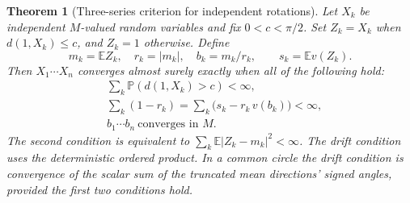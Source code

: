 \documentclass[11pt,reqno]{amsart}
\newtheorem{theorem}{Theorem}[section]
\theoremstyle{definition}
\theoremstyle{remark}
\numberwithin{equation}{section}
\begin{document}
\begin{theorem}[Three-series criterion for independent rotations]\label{m6:three}
Let \(X_k\) be independent \(M\)-valued random variables and fix
\(0<c<\pi/2\). Set \(Z_k=X_k\) when \(d(1,X_k)\le c\), and
\(Z_k=1\) otherwise. Define
\[
 m_k=\mathbb E Z_k,\quad r_k=|m_k|,\quad b_k=m_k/r_k,\qquad
 s_k=\mathbb E v(Z_k).
\]
Then \(X_1\cdots X_n\) converges almost surely exactly when all of
the following hold:
\[
\begin{split}
 &\sum_k\mathbb P(d(1,X_k)>c)<\infty,\\
 &\sum_k(1-r_k)
   =\sum_k\bigl(s_k-r_k\,v(b_k)\bigr)<\infty,\\
 &b_1\cdots b_n\ \text{converges in }M .
\end{split}
\]
The second condition is equivalent to
\(\sum_k\mathbb E|Z_k-m_k|^2<\infty\).
The drift condition uses the deterministic ordered product. In a
common circle the drift condition is convergence of the scalar sum
of the truncated mean directions' signed angles, provided the
first two conditions hold.
\end{theorem}
\end{document}
